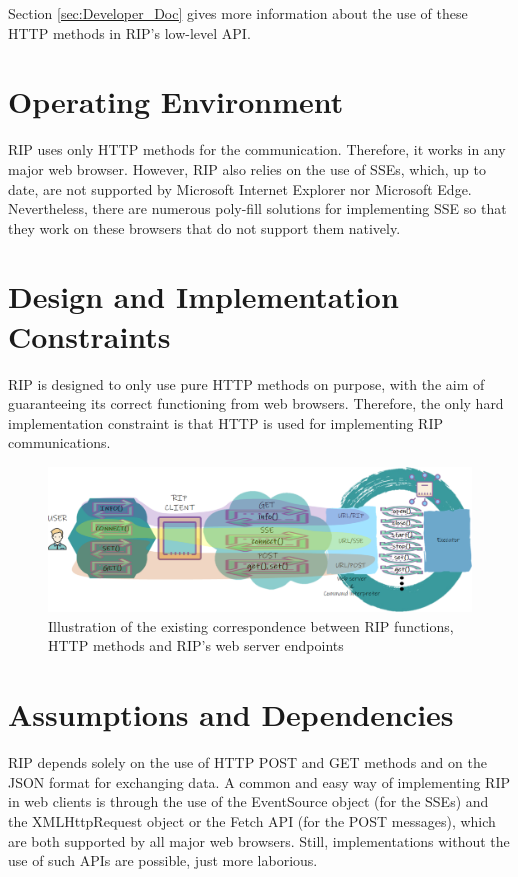Section \ref{sec:Developer_Doc} gives more information about the use of these HTTP methods in RIP's low-level API.

\section{Operating Environment}
RIP uses only HTTP methods for the communication. Therefore, it works in any major web browser. However, RIP also relies on the use of SSEs, which, up to date, are not supported by Microsoft Internet Explorer nor Microsoft Edge. Nevertheless, there are numerous poly-fill solutions for implementing SSE so that they work on these browsers that do not support them natively.

\section{Design and Implementation Constraints}
RIP is designed to only use pure HTTP methods on purpose, with the aim of guaranteeing its correct functioning from web browsers. Therefore, the only hard implementation constraint is that HTTP is used for implementing RIP communications.

\begin{figure}[ht!]
\centering
\includegraphics[width=\textwidth]{images/Correspondence.pdf}
\caption{Illustration of the existing correspondence between RIP functions, HTTP methods and RIP's web server endpoints}
\label{fig:client-server-funtions-correspondence}
\end{figure}

\section{Assumptions and Dependencies}
RIP depends solely on the use of HTTP POST and GET methods and on the JSON format for exchanging data. 
A common and easy way of implementing RIP in web clients is through the use of the EventSource object \cite{sse} (for the SSEs) and the XMLHttpRequest object \cite{xhr} or the Fetch API \cite{fetch} (for the POST messages), which are both supported by all major web browsers. Still, implementations without the use of such APIs are possible, just more laborious. 

